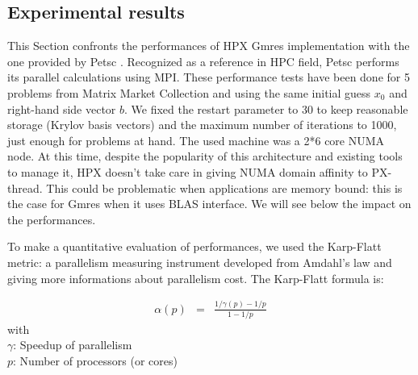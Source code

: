 \documentclass[smallextended]{svjour3}
\begin{document}
\subsection{Experimental results}
This Section confronts the performances of HPX Gmres implementation with the one provided by Petsc \cite{Petsc}. Recognized as a reference in HPC field, Petsc performs its parallel calculations using MPI. These performance tests have been done for 5 problems from Matrix Market Collection and using the same initial guess $x_{0}$ and right-hand side vector $b$. We fixed the restart parameter to 30 to keep reasonable storage (Krylov basis vectors) and the maximum number of iterations to 1000, just enough for problems at hand. The used machine was a 2*6 core NUMA node. At this time, despite the popularity of this architecture and existing tools to manage it, HPX doesn't take care in giving NUMA domain affinity to PX-thread. This could be problematic when applications are memory bound: this is the case for Gmres when it uses BLAS interface. We will see below the impact on the performances.\smallskip  

To make a quantitative evaluation of performances, we used the Karp-Flatt metric: a parallelism measuring instrument developed from Amdahl's law and giving more informations about parallelism cost. The Karp-Flatt formula is:

\begin{eqnarray}
\alpha(p) &=&\frac{1/\gamma(p) - 1/p}{1-1/p} \label{KarpFlatt}
\end{eqnarray}
with\\
$\gamma$: Speedup of parallelism\\
$p$: Number of processors (or cores)\\
\end{document}
